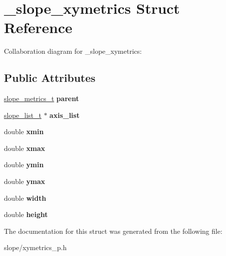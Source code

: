 \hypertarget{struct__slope__xymetrics}{\section{\+\_\+slope\+\_\+xymetrics Struct Reference}
\label{struct__slope__xymetrics}
}


Collaboration diagram for \+\_\+slope\+\_\+xymetrics\+:
\subsection*{Public Attributes}
\begin{DoxyCompactItemize}
\item 
\hypertarget{struct__slope__xymetrics_aec0f7546c89f84b770fe7967602f8b5f}{\hyperlink{group__Metrics_gab80787ee8ae8dc449e770249fe0e3c35}{slope\+\_\+metrics\+\_\+t} {\bfseries parent}}\label{struct__slope__xymetrics_aec0f7546c89f84b770fe7967602f8b5f}

\item 
\hypertarget{struct__slope__xymetrics_a0872d22ecbf7129241bf947cfef15769}{\hyperlink{struct__slope__list}{slope\+\_\+list\+\_\+t} $\ast$ {\bfseries axis\+\_\+list}}\label{struct__slope__xymetrics_a0872d22ecbf7129241bf947cfef15769}

\item 
\hypertarget{struct__slope__xymetrics_ad1d3347be073c3d5e54dcc4fcf8be3f0}{double {\bfseries xmin}}\label{struct__slope__xymetrics_ad1d3347be073c3d5e54dcc4fcf8be3f0}

\item 
\hypertarget{struct__slope__xymetrics_a1b5bc871445b58a36fdbd8fda316da64}{double {\bfseries xmax}}\label{struct__slope__xymetrics_a1b5bc871445b58a36fdbd8fda316da64}

\item 
\hypertarget{struct__slope__xymetrics_a0185807d2c62875950fb1001005ee0b3}{double {\bfseries ymin}}\label{struct__slope__xymetrics_a0185807d2c62875950fb1001005ee0b3}

\item 
\hypertarget{struct__slope__xymetrics_a68d0668dd3b423c8fb44fe943cfaaed6}{double {\bfseries ymax}}\label{struct__slope__xymetrics_a68d0668dd3b423c8fb44fe943cfaaed6}

\item 
\hypertarget{struct__slope__xymetrics_adecdb95c1bc9394ea4332c2182539153}{double {\bfseries width}}\label{struct__slope__xymetrics_adecdb95c1bc9394ea4332c2182539153}

\item 
\hypertarget{struct__slope__xymetrics_a51349b89d2fb960fe1503ac3104d80d0}{double {\bfseries height}}\label{struct__slope__xymetrics_a51349b89d2fb960fe1503ac3104d80d0}

\end{DoxyCompactItemize}


The documentation for this struct was generated from the following file\+:\begin{DoxyCompactItemize}
\item 
slope/xymetrics\+\_\+p.\+h\end{DoxyCompactItemize}
